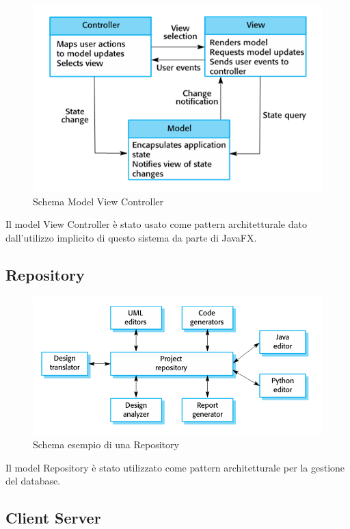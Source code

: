 \documentclass[12pt, a4paper]{report}
\begin{document}
\begin{figure}[h]
  \centering
  \includegraphics[width=\textwidth]{MVC.PNG}
  \caption{Schema Model View Controller}
\end{figure}

Il model View Controller è stato usato come pattern architetturale dato 
dall'utilizzo implicito di questo sistema da parte di JavaFX.

\subsection{Repository}

\begin{figure}[H]
  \centering
  \includegraphics[width=\textwidth]{Repository.PNG}
  \caption{Schema esempio di una Repository}
\end{figure}
Il model Repository è stato utilizzato come pattern architetturale per la gestione del database. 

\subsection{Client Server}
\end{document}
